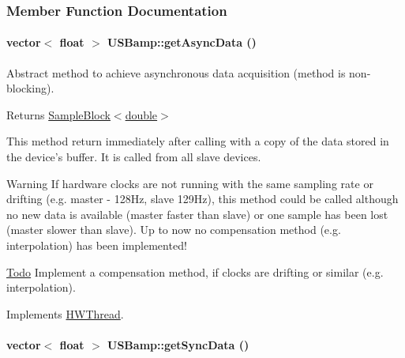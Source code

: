 \subsubsection{Member Function Documentation}
\hypertarget{class_u_s_bamp_a645a210ffbc5931560f91c8ee6896300}{
\paragraph[{getAsyncData}]{\setlength{\rightskip}{0pt plus 5cm}vector$<$ float $>$ USBamp::getAsyncData ()}\hfill}
\label{class_u_s_bamp_a645a210ffbc5931560f91c8ee6896300}


Abstract method to achieve asynchronous data acquisition (method is non-\/blocking). \begin{DoxyReturn}{Returns}
\hyperlink{class_sample_block}{SampleBlock$<$double$>$}
\end{DoxyReturn}
This method return immediately after calling with a copy of the data stored in the device's buffer. It is called from all slave devices. \begin{DoxyWarning}{Warning}
If hardware clocks are not running with the same sampling rate or drifting (e.g. master -\/ 128Hz, slave 129Hz), this method could be called although no new data is available (master faster than slave) or one sample has been lost (master slower than slave). Up to now no compensation method (e.g. interpolation) has been implemented! 
\end{DoxyWarning}
\begin{Desc}
\item[\hyperlink{todo__todo000009}{Todo}]Implement a compensation method, if clocks are drifting or similar (e.g. interpolation). \end{Desc}


Implements \hyperlink{class_h_w_thread_aa709526a915411a495a947f6bc6e06f9}{HWThread}.\hypertarget{class_u_s_bamp_ae5aa6002d425924a95d102f1d890c84c}{
\paragraph[{getSyncData}]{\setlength{\rightskip}{0pt plus 5cm}vector$<$ float $>$ USBamp::getSyncData ()}\hfill}
\label{class_u_s_bamp_ae5aa6002d425924a95d102f1d890c84c}


